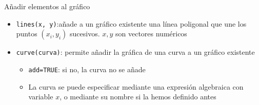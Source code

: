 \documentclass[
  ignorenonframetext,
]{beamer}
\providecommand{\tightlist}{%
  \setlength{\itemsep}{0pt}\setlength{\parskip}{0pt}}
\begin{document}
\begin{frame}[fragile]{Añadir elementos al gráfico}
\label{auxf1adir-elementos-al-gruxe1fico-2}
\begin{itemize}
\tightlist
\item
  \texttt{lines(x,\ y)}:añade a un gráfico existente una línea poligonal
  que une los puntos \((x_i, y_i)\) sucesivos. \(x,y\) son vectores
  numéricos
\item
  \texttt{curve(curva)}: permite añadir la gráfica de una curva a un
  gráfico existente

  \begin{itemize}
  \tightlist
  \item
    \texttt{add=TRUE}: si no, la curva no se añade
  \item
    La curva se puede especificar mediante una expresión algebraica con
    variable \(x\), o mediante su nombre si la hemos definido antes
  \end{itemize}
\end{itemize}
\end{frame}
\end{document}
